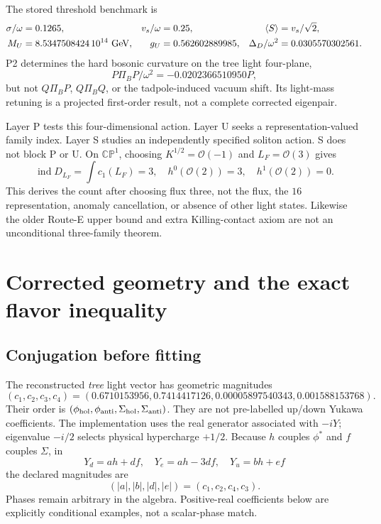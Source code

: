 \documentclass[11pt]{article}
\begin{document}
The stored threshold benchmark is
\begin{align}
\sigma/\omega&=0.1265,&v_s/\omega&=0.25,&
\langle S\rangle&=v_s/\sqrt2,\\
M_U&=8.5347508424\,10^{14}\ {\rm GeV},&
g_U&=0.562602889985,&
\Delta_D/\omega^2&=0.0305570302561 .
\end{align}
P2 determines the hard bosonic curvature on the tree light four-plane,
\[
P\Pi_BP/\omega^2=-0.0202366510950P,
\]
but not $Q\Pi_BP$, $Q\Pi_BQ$, or the tadpole-induced vacuum shift.
Its light-mass retuning is a projected first-order result, not a
complete corrected eigenpair.

Layer P tests this four-dimensional action. Layer U seeks a
representation-valued family index. Layer S studies an independently
specified soliton action. S does not block P or U.
On $\mathbb{CP}^1$, choosing $K^{1/2}=\mathcal O(-1)$ and
$L_F=\mathcal O(3)$ gives
\[
\operatorname{ind}D_{L_F}=\int c_1(L_F)=3,\quad
h^0(\mathcal O(2))=3,\quad h^1(\mathcal O(2))=0.
\]
This derives the count after choosing flux three, not the flux,
the $16$ representation, anomaly cancellation, or absence of other
light states. Likewise the older Route-E upper bound and extra
Killing-contact axiom are not an unconditional three-family theorem.

\section{Corrected geometry and the exact flavor inequality}
\subsection{Conjugation before fitting}
The reconstructed \emph{tree} light vector has geometric magnitudes
\begin{equation}
(c_1,c_2,c_3,c_4)=
(0.6710153956,0.7414417126,0.00005897540343,0.001588153768).
\label{eq:c}
\end{equation}
Their order is
$(\phi_{\rm hol},\phi_{\rm anti},\Sigma_{\rm hol},\Sigma_{\rm anti})$.
They are not pre-labelled up/down Yukawa coefficients.
The implementation uses the real generator associated with $-iY$;
eigenvalue $-i/2$ selects physical hypercharge $+1/2$.
Because $h$ couples $\phi^*$ and $f$ couples $\Sigma$, in
\begin{equation}
Y_d=ah+df,\quad Y_e=ah-3df,\quad Y_u=bh+ef
\end{equation}
the declared magnitudes are
\begin{equation}
(|a|,|b|,|d|,|e|)=(c_1,c_2,c_4,c_3).
\label{eq:map}
\end{equation}
Phases remain arbitrary in the algebra. Positive-real coefficients below
are explicitly conditional examples, not a scalar-phase match.
\end{document}
